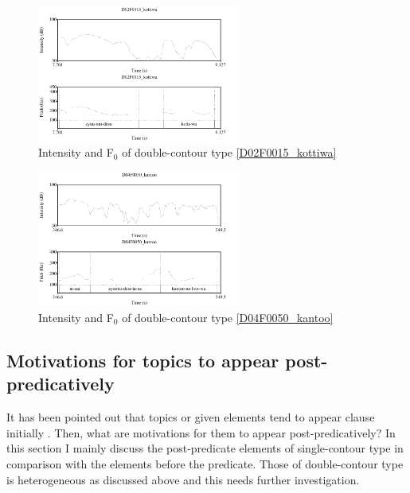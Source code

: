 \begin{figure}
	\begin{center}
	\includegraphics[width=0.6\textwidth]{sounds/D02F0015_kottiwa.pdf}
	\caption{Intensity and F$_{0}$ of double-contour type \ref{D02F0015_kottiwa}}
	\label{D02F0015_kottiwaF}
	\end{center}
\end{figure}
\begin{figure}
	\begin{center}
	\includegraphics[width=0.6\textwidth]{sounds/D04F0050_kantoo.pdf}
	\caption{Intensity and F$_{0}$ of double-contour type \ref{D04F0050_kantoo}}
	\label{D04F0050_kantooF}
	\end{center}
\end{figure}



\subsection{Motivations for topics to appear post-predicatively}\label{WO:PostP:Motivations}

It has been pointed out that
topics or given elements tend to appear clause initially \cite{mathesius28,firbas64,danes70}.
Then, what are motivations for them to appear post-predicatively?
In this section I mainly discuss the post-predicate elements of single-contour type in comparison with the elements before the predicate.
Those of double-contour type is heterogeneous as discussed above and this needs further investigation.



